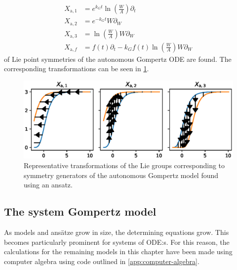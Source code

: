 \begin{align*}
  X_{\text{a},1} &= e^{k_G t} \ln\left(\frac{W}{A}\right) \partial_t \\
  X_{\text{a},2} &= e^{-k_G t} W \partial_W \\
  X_{\text{a},3} &= \ln\left(\frac{W}{A}\right) W \partial_W \\
  X_{\text{a},f} &= f(t) \partial_t - k_G f(t) \ln\left(\frac{W}{A}\right) W \partial_W
\end{align*}
of Lie point symmetries of the autonomous Gompertz ODE  are found.
The corresponding transformations can be seen in \cref{fig:gompertz-autonomous-ansatz}.
\begin{figure}
  \centering
  \includegraphics[width=.96\textwidth]{images/gompertz-autonomous-ansatz}
  \caption{Representative transformations of the Lie groups corresponding to symmetry generators of the autonomous Gompertz model found using an ansatz.}
  \label{fig:gompertz-autonomous-ansatz}
\end{figure}

\subsection{The system Gompertz model}

As models and ansätze grow in size, the determining equations grow.
This becomes particularly prominent for systems of ODE:s.
For this reason, the calculations for the remaining models in this chapter have been made using computer algebra using code outlined in \cref{app:computer-algebra}.

